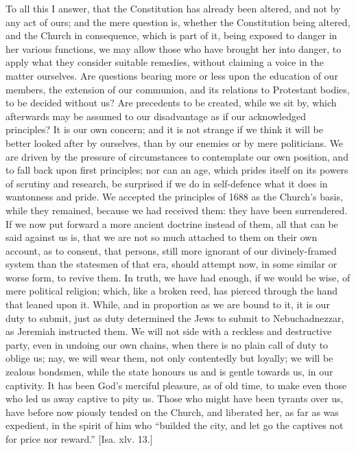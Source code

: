 To all this I answer, that the Constitution has already been
altered, and not by any act of ours; and the mere question is,
whether the Constitution being altered, and the Church in consequence,
which is part of it, being exposed to danger in her various functions,
we may allow those who have brought her into danger, to apply what
they consider suitable remedies, without claiming a voice in the
matter ourselves. Are questions bearing more or less upon the
education of our members, the extension of our communion, and its
relations to Protestant bodies, to be decided without us? Are
precedents to be created, while we sit by, which afterwards may be
assumed to our disadvantage as if our acknowledged principles? It is
our own concern; and it is not strange if we think it will be better
looked after by ourselves, than by our enemies or by mere politicians.
We are driven by the pressure of circumstances to contemplate our own
position, and to fall back upon first principles; nor can an age,
which prides itself on its powers of scrutiny and research, be
surprised if we do in self-defence what it does in wantonness and
pride. We accepted the principles of 1688 as the Church's basis,
while they remained, because we had received them: they have been
surrendered. If we now put forward a more ancient doctrine instead of
them, all that can be said against us is, that we are not so much
attached to them on their own account, as to consent, that persons,
still more ignorant of our divinely-framed system than the statesmen
of that era, should attempt now, in some similar or worse form, to
revive them. In truth, we have had enough, if we would be wise, of
mere political religion; which, like a broken reed, has pierced
through the hand that leaned upon it. While, and in proportion as we
are bound to it, it is our duty to submit, just as duty determined the
Jews to submit to Nebuchadnezzar, as Jeremiah instructed them. We will
not side with a reckless and destructive party, even in undoing our
own chains, when there is no plain call of duty to oblige us;
nay, we will wear them, not only contentedly but loyally; we will be
zealous bondsmen, while the state honours us and is gentle towards us,
in our captivity. It has been God's merciful pleasure, as of old
time, to make even those who led us away captive to pity us. Those who
might have been tyrants over us, have before now piously tended on the
Church, and liberated her, as far as was expedient, in the spirit of
him who ``builded the city, and let go the captives not for price
nor reward.'' [Isa. xlv. 13.]

